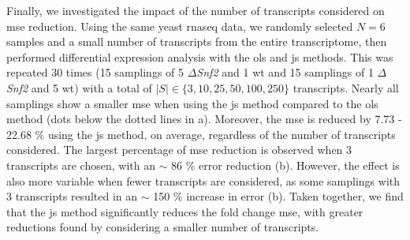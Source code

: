 Finally, we investigated the impact of the number of transcripts considered on \gls{mse} reduction.
Using the same yeast \gls{rnaseq} data, we randomly selected $N = 6$ samples and a small number of transcripts from the entire transcriptome, then performed differential expression analysis with the \gls{ols} and \gls{js} methods.
This was repeated 30 times (15 samplings of 5 $\Delta$\emph{Snf2} and 1 \gls{wt} and 15 samplings of 1 $\Delta$\emph{Snf2} and 5 \gls{wt}) with a total of $|S| \in \{ 3, 10, 25, 50, 100, 250 \}$ transcripts.
Nearly all samplings show a smaller \gls{mse} when using the \gls{js} method compared to the \gls{ols} method (dots below the dotted lines in a).
Moreover, the \gls{mse} is reduced by 7.73 - 22.68 \% using the \gls{js} method, on average, regardless of the number of transcripts considered.
The largest percentage of \gls{mse} reduction is observed when 3 transcripts are chosen, with an $\sim$ 86 \% error reduction (b).
However, the effect is also more variable when fewer transcripts are considered, as some samplings with 3 transcripts resulted in an $\sim$ 150 \% increase in error (b).
Taken together, we find that the \gls{js} method significantly reduces the fold change \gls{mse}, with greater reductions found by considering a smaller number of transcripts.

